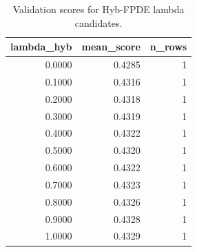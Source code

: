 \begin{table}[t]
\caption{Validation scores for Hyb-FPDE lambda candidates.}
\label{tab:lambda_distribution_computed}
\centering
\begin{tabular}{rrr}
\toprule
lambda\_hyb & mean\_score & n\_rows \\
\midrule
0.0000 & 0.4285 & 1 \\
0.1000 & 0.4316 & 1 \\
0.2000 & 0.4318 & 1 \\
0.3000 & 0.4319 & 1 \\
0.4000 & 0.4322 & 1 \\
0.5000 & 0.4320 & 1 \\
0.6000 & 0.4322 & 1 \\
0.7000 & 0.4323 & 1 \\
0.8000 & 0.4326 & 1 \\
0.9000 & 0.4328 & 1 \\
1.0000 & 0.4329 & 1 \\
\bottomrule
\end{tabular}

\end{table}
